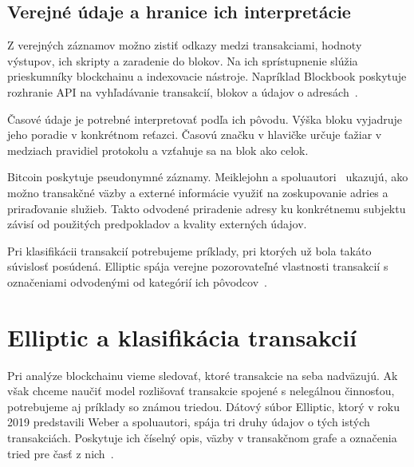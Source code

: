 \subsection{Verejné údaje a hranice ich interpretácie}
\label{sec:bitcoin-public-data}

Z verejných záznamov možno zistiť odkazy medzi transakciami, hodnoty
výstupov, ich skripty a zaradenie do blokov. Na ich sprístupnenie
slúžia prieskumníky blockchainu a indexovacie nástroje.
Napríklad Blockbook poskytuje rozhranie API na vyhľadávanie
transakcií, blokov a údajov o adresách~\cite{trezorBlockbook}.

Časové údaje je potrebné interpretovať podľa ich pôvodu.
Výška bloku vyjadruje jeho poradie v konkrétnom reťazci.
Časovú značku v hlavičke určuje ťažiar v medziach pravidiel
protokolu a vzťahuje sa na blok ako celok.

Bitcoin poskytuje pseudonymné záznamy. Meiklejohn
a spoluautori~\cite{meiklejohn2016fistful} ukazujú, ako možno transakčné
väzby a externé informácie využiť na zoskupovanie adries a priraďovanie
služieb. Takto odvodené priradenie adresy ku konkrétnemu subjektu
závisí od použitých predpokladov a kvality externých údajov.

Pri klasifikácii transakcií potrebujeme príklady, pri ktorých už
bola takáto súvislosť posúdená. Elliptic spája verejne pozorovateľné
vlastnosti transakcií s označeniami odvodenými od kategórií ich
pôvodcov~\cite{weber2019elliptic}.

\section{Elliptic a klasifikácia transakcií}
\label{sec:elliptic}

Pri analýze blockchainu vieme sledovať, ktoré transakcie na seba
nadväzujú. Ak však chceme naučiť model rozlišovať transakcie
spojené s nelegálnou činnosťou, potrebujeme aj príklady so známou
triedou. Dátový súbor Elliptic, ktorý v roku 2019 predstavili
Weber a spoluautori, spája tri druhy údajov o tých istých
transakciách. Poskytuje ich číselný opis, väzby v transakčnom
grafe a označenia tried pre časť z nich~\cite{weber2019elliptic}.


